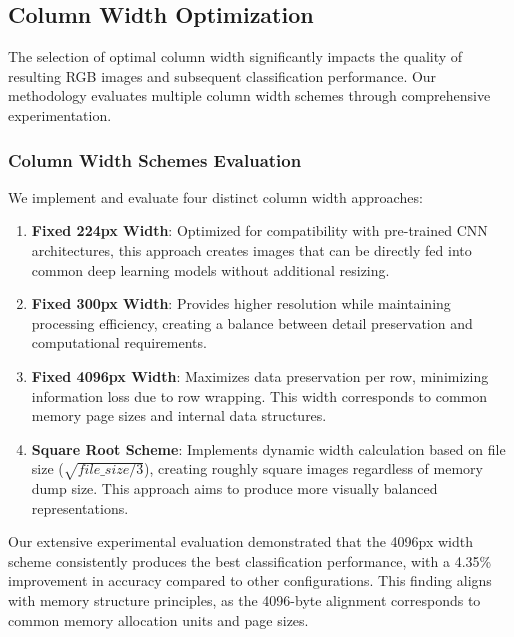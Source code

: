 \subsection{Column Width Optimization}
\label{subsec:column-width}

The selection of optimal column width significantly impacts the quality of resulting RGB images and subsequent classification performance. Our methodology evaluates multiple column width schemes through comprehensive experimentation.

\subsubsection{Column Width Schemes Evaluation}

We implement and evaluate four distinct column width approaches:

\begin{enumerate}
    \item \textbf{Fixed 224px Width}: Optimized for compatibility with pre-trained CNN architectures, this approach creates images that can be directly fed into common deep learning models without additional resizing.
    
    \item \textbf{Fixed 300px Width}: Provides higher resolution while maintaining processing efficiency, creating a balance between detail preservation and computational requirements.
    
    \item \textbf{Fixed 4096px Width}: Maximizes data preservation per row, minimizing information loss due to row wrapping. This width corresponds to common memory page sizes and internal data structures.
    
    \item \textbf{Square Root Scheme}: Implements dynamic width calculation based on file size ($\sqrt{file\_size/3}$), creating roughly square images regardless of memory dump size. This approach aims to produce more visually balanced representations.
\end{enumerate}

Our extensive experimental evaluation demonstrated that the 4096px width scheme consistently produces the best classification performance, with a 4.35\% improvement in accuracy compared to other configurations. This finding aligns with memory structure principles, as the 4096-byte alignment corresponds to common memory allocation units and page sizes.


